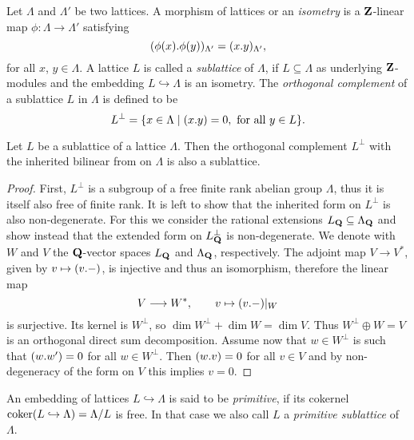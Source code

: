 \begin{definition}
    Let $\Lambda$ and $\Lambda'$ be two lattices. A morphism of lattices or an \emph{isometry} is a $\mathbf Z$-linear map $\phi \colon \Lambda \to \Lambda'$ satisfying
    \[
        (\phi(x).\phi(y))_{\Lambda'} = (x.y)_{\Lambda'},
    \]
    for all $x$, $y \in \Lambda$. A lattice $L$ is called a \emph{sublattice} of $\Lambda$, if $L \subseteq \Lambda$ as underlying $\mathbf Z$-modules and the embedding $L\hookrightarrow \Lambda$ is an isometry. The \emph{orthogonal complement} of a sublattice $L$ in $\Lambda$ is defined to be
    \[
        L^\perp = \{x \in \Lambda \mid (x.y) = 0, \text{ for all $y \in L$}\}.
    \]
\end{definition}

\begin{lemma}
    \label{orthogonal complemet is a lattice}
    Let $L$ be a sublattice of a lattice $\Lambda$. Then the orthogonal complement $L^\perp$ with the inherited bilinear from on $\Lambda$ is also a sublattice.
\end{lemma}

\begin{proof}
    First, $L^\perp$ is a subgroup of a free finite rank abelian group $\Lambda$, thus it is itself also free of finite rank. It is left to show that the inherited form on $L^\perp$ is also non-degenerate. For this we consider the rational extensions $L_\mathbf Q \subseteq \Lambda_\mathbf Q$ and show instead that the extended form on $L_\mathbf Q^\perp$ is non-degenerate. We denote with $W$ and $V$ the $\mathbf Q$-vector spaces $L_\mathbf Q$ and $\Lambda_\mathbf Q$, respectively. The adjoint map $V \to V^*$, given by $v \mapsto (v.-)$, is injective and thus an isomorphism, therefore the linear map
    \[  
        V \longrightarrow W^*, \qquad v \mapsto (v.-)|_W
    \]  
    is surjective. Its kernel is $W^\perp$, so $\dim W^\perp + \dim W = \dim V$. Thus $W^\perp \oplus W = V$ is an orthogonal direct sum decomposition. Assume now that $w \in W^\perp$ is such that $(w.w') = 0$ for all $w \in W^\perp$. Then $(w.v) = 0$ for all $v \in V$ and by non-degeneracy of the form on $V$ this implies $v = 0$.
\end{proof}

\begin{definition}
    An embedding of lattices $L \hookrightarrow \Lambda$ is said to be \emph{primitive}, if its cokernel $\operatorname{coker}(L \hookrightarrow \Lambda) = \Lambda/L$ is free. In that case we also call $L$ a \emph{primitive sublattice} of $\Lambda$.
\end{definition}

